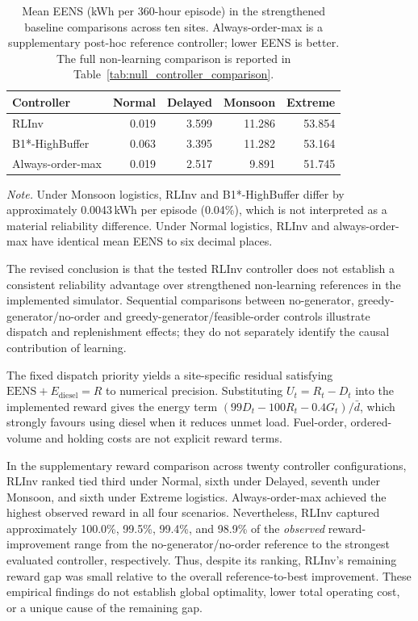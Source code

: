 \begin{table}[htbp]
\centering
\small
\caption{Mean EENS (kWh per 360-hour episode) in the strengthened
baseline comparisons across ten sites. Always-order-max is a
supplementary post-hoc reference controller; lower EENS is better.
The full non-learning comparison is reported in
Table~\ref{tab:null_controller_comparison}.}
\label{tab:rebuttal_baseline_eens}
\begin{tabular}{lrrrr}
\toprule
\textbf{Controller} & \textbf{Normal} & \textbf{Delayed} &
\textbf{Monsoon} & \textbf{Extreme} \\
\midrule
RLInv & 0.019 & 3.599 & 11.286 & 53.854 \\
B1*-HighBuffer & 0.063 & 3.395 & 11.282 & 53.164 \\
Always-order-max & 0.019 & 2.517 & 9.891 & 51.745 \\
\bottomrule
\end{tabular}

\par\smallskip
\begin{minipage}{0.97\linewidth}
\footnotesize\emph{Note.} Under Monsoon logistics, RLInv and
B1*-HighBuffer differ by approximately 0.0043\,kWh per episode
(0.04\%), which is not interpreted as a material reliability
difference. Under Normal logistics, RLInv and always-order-max have
identical mean EENS to six decimal places.
\end{minipage}
\end{table}


The revised conclusion is that the tested RLInv controller does not
establish a consistent reliability advantage over strengthened
non-learning references in the implemented simulator. Sequential
comparisons between no-generator, greedy-generator/no-order and
greedy-generator/feasible-order controls illustrate dispatch and
replenishment effects; they do not separately identify the causal
contribution of learning.

The fixed dispatch priority yields a site-specific residual
satisfying $\mathrm{EENS}+E_{\mathrm{diesel}}=R$ to numerical
precision. Substituting $U_t=R_t-D_t$ into the implemented reward
gives the energy term $(99D_t-100R_t-0.4G_t)/\bar d$, which strongly
favours using diesel when it reduces unmet load. Fuel-order,
ordered-volume and holding costs are not explicit reward terms.

In the supplementary reward comparison across twenty
controller configurations, RLInv ranked tied third under
Normal, sixth under Delayed, seventh under Monsoon, and
sixth under Extreme logistics. Always-order-max achieved
the highest observed reward in all four scenarios.
Nevertheless, RLInv captured approximately 100.0\%,
99.5\%, 99.4\%, and 98.9\% of the \emph{observed}
reward-improvement range from the no-generator/no-order
reference to the strongest evaluated controller,
respectively. Thus, despite its ranking, RLInv's
remaining reward gap was small relative to the overall
reference-to-best improvement. These empirical findings
do not establish global optimality, lower total
operating cost, or a unique cause of the remaining gap.


